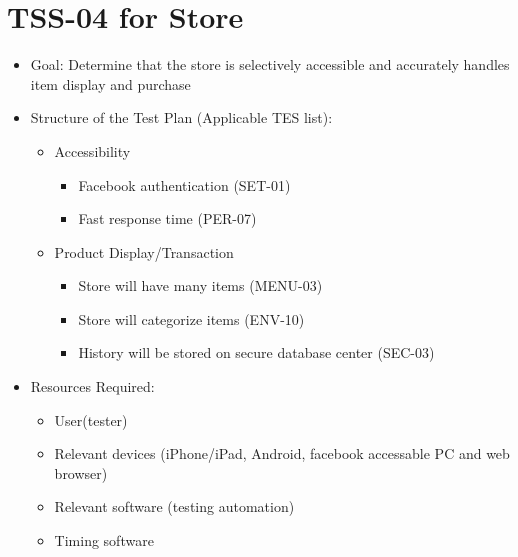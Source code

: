 \section{TSS-04 for Store}
\begin{itemize}
\item Goal: Determine that the store is selectively accessible and accurately handles item display and purchase

\item Structure of the Test Plan (Applicable TES list):
\begin{itemize}
\item Accessibility
\begin{itemize}
\item Facebook authentication (SET-01)
\item Fast response time (PER-07)
\end{itemize}

\item Product Display/Transaction
\begin{itemize}
\item Store will have many items (MENU-03)
\item Store will categorize items (ENV-10)
\item History will be stored on secure database center (SEC-03)
\end{itemize}
\end{itemize}

\item Resources Required:
\begin{itemize}
\item User(tester)
\item Relevant devices (iPhone/iPad, Android, facebook accessable PC and web browser)
\item Relevant software (testing automation)
\item Timing software
\end{itemize}
\end{itemize}


